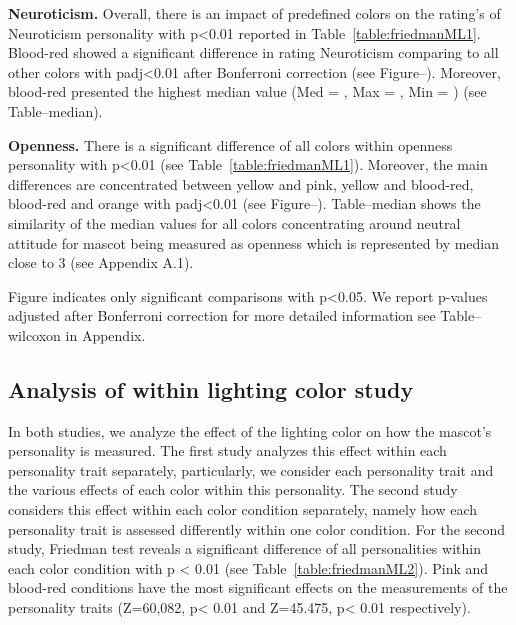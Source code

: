 \par \textbf{Neuroticism.}
Overall, there is an impact of predefined colors on the rating's of Neuroticism
personality with p<0.01 reported in Table~\ref{table:friedmanML1}.
Blood-red showed a significant difference in rating Neuroticism comparing
to all other colors with padj<0.01 after Bonferroni correction (see Figure--).
Moreover, blood-red presented the highest median value (Med = , Max = , Min = ) (see Table--median).

\par \textbf{Openness.}
There is a significant difference of all colors within openness personality
with p<0.01 (see Table~\ref{table:friedmanML1}).
Moreover, the main differences are concentrated between yellow and pink, yellow and blood-red,
blood-red and orange with padj<0.01 (see Figure--).
Table--median shows the similarity of the median values for all colors concentrating around neutral attitude for mascot
being measured as openness which is represented by median close to 3 (see Appendix A.1).

Figure indicates only significant comparisons with p<0.05.
We report p-values adjusted after Bonferroni correction for more
detailed information see Table--wilcoxon in Appendix.


\subsection{Analysis of within lighting color study}
\label{Study2(M-L)}
In both studies, we analyze the effect of the lighting color on how the mascot’s personality is measured.
The first study analyzes this effect within each personality trait separately, particularly, we consider each
personality trait and the various effects of each color within this personality. The second study considers this
effect within each color condition separately, namely how each personality trait is assessed differently within one color condition.
For the second study, Friedman test reveals a significant difference of all personalities within each color
condition with p < 0.01 (see Table~\ref{table:friedmanML2}). Pink and blood-red conditions have the most significant
effects on the measurements of the personality traits
(Z=60,082, p< 0.01 and Z=45.475, p< 0.01 respectively). 

